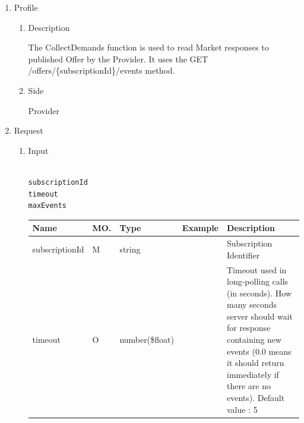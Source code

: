 \newpage


\begin{enumerate}

\item Profile

\begin{enumerate}

\item Description

The CollectDemands function is used to read Market responses to published Offer by the Provider. 
It uses the GET /offers/\{subscriptionId\}/events method.

\item Side

Provider

\end{enumerate}

\item Request

\begin{enumerate}

\item Input

\begin{tcolorbox}[boxrule=0pt, frame empty]
\begin{verbatim}

subscriptionId
timeout
maxEvents

\end{verbatim}
\end{tcolorbox}


\begin{center}
\begin{tabular}{|p{3cm}|l|p{3cm}|p{3cm}|p{4cm}|} 
\hline
\rowcolor{lightgray}	Name	& MO.	& Type	& Example & 	Description \\
\hline

subscriptionId	& M	& 	string			&		&	Subscription Identifier \\ 

\hline

timeout			& O	& 	number(\$float)	&		&	Timeout used in long-polling calls (in seconds). 
													How many seconds server should wait for response containing new events 
													(0.0 means it should return immediately if there are no events).	Default value : 5 \\ 


\end{tabular}
\end{center}
\end{enumerate}
\end{enumerate}
